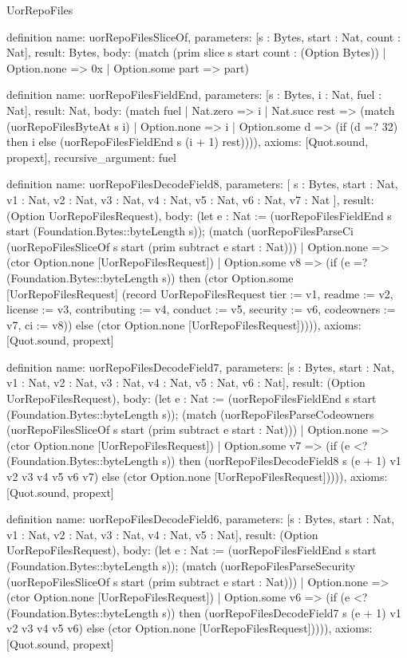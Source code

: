 \begin{lexlean}{UorRepoFiles}
\begin{semanticmodule}
definition{
  name: uorRepoFilesSliceOf,
  parameters: [s : Bytes, start : Nat, count : Nat],
  result: Bytes,
  body: (match (prim slice s start count : (Option Bytes))
    | Option.none => 0x
    | Option.some part => part)
}

definition{
  name: uorRepoFilesFieldEnd,
  parameters: [s : Bytes, i : Nat, fuel : Nat],
  result: Nat,
  body: (match fuel
    | Nat.zero => i
    | Nat.succ rest => (match (uorRepoFilesByteAt s i)
      | Option.none => i
      | Option.some d => (if (d =? 32) then i else (uorRepoFilesFieldEnd s (i + 1) rest)))),
  axioms: [Quot.sound, propext],
  recursive_argument: fuel
}

definition{
  name: uorRepoFilesDecodeField8,
  parameters: [
    s : Bytes,
    start : Nat,
    v1 : Nat,
    v2 : Nat,
    v3 : Nat,
    v4 : Nat,
    v5 : Nat,
    v6 : Nat,
    v7 : Nat
  ],
  result: (Option UorRepoFilesRequest),
  body: (let e : Nat := (uorRepoFilesFieldEnd s start (Foundation.Bytes::byteLength s)); (match (uorRepoFilesParseCi (uorRepoFilesSliceOf s start (prim subtract e start : Nat)))
    | Option.none => (ctor Option.none [UorRepoFilesRequest])
    | Option.some v8 => (if (e =? (Foundation.Bytes::byteLength s)) then (ctor Option.some [UorRepoFilesRequest] (record UorRepoFilesRequest {tier := v1, readme := v2, license := v3, contributing := v4, conduct := v5, security := v6, codeowners := v7, ci := v8})) else (ctor Option.none [UorRepoFilesRequest])))),
  axioms: [Quot.sound, propext]
}

definition{
  name: uorRepoFilesDecodeField7,
  parameters: [s : Bytes, start : Nat, v1 : Nat, v2 : Nat, v3 : Nat, v4 : Nat, v5 : Nat, v6 : Nat],
  result: (Option UorRepoFilesRequest),
  body: (let e : Nat := (uorRepoFilesFieldEnd s start (Foundation.Bytes::byteLength s)); (match (uorRepoFilesParseCodeowners (uorRepoFilesSliceOf s start (prim subtract e start : Nat)))
    | Option.none => (ctor Option.none [UorRepoFilesRequest])
    | Option.some v7 => (if (e <? (Foundation.Bytes::byteLength s)) then (uorRepoFilesDecodeField8 s (e + 1) v1 v2 v3 v4 v5 v6 v7) else (ctor Option.none [UorRepoFilesRequest])))),
  axioms: [Quot.sound, propext]
}

definition{
  name: uorRepoFilesDecodeField6,
  parameters: [s : Bytes, start : Nat, v1 : Nat, v2 : Nat, v3 : Nat, v4 : Nat, v5 : Nat],
  result: (Option UorRepoFilesRequest),
  body: (let e : Nat := (uorRepoFilesFieldEnd s start (Foundation.Bytes::byteLength s)); (match (uorRepoFilesParseSecurity (uorRepoFilesSliceOf s start (prim subtract e start : Nat)))
    | Option.none => (ctor Option.none [UorRepoFilesRequest])
    | Option.some v6 => (if (e <? (Foundation.Bytes::byteLength s)) then (uorRepoFilesDecodeField7 s (e + 1) v1 v2 v3 v4 v5 v6) else (ctor Option.none [UorRepoFilesRequest])))),
  axioms: [Quot.sound, propext]
}


\end{semanticmodule}
\end{lexlean}
